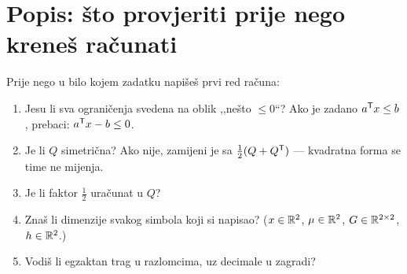 \section{Popis: što provjeriti prije nego kreneš računati}
\label{sec:kontrolna-lista}

\begin{predznanje}
Prije nego u bilo kojem zadatku napišeš prvi red računa:
\begin{enumerate}[nosep,leftmargin=*]
  \item Jesu li sva ograničenja svedena na oblik ,,nešto $\leq 0$``? Ako je
        zadano $a^{\mathsf{T}} x \leq b$, prebaci: $a^{\mathsf{T}} x - b \leq 0$.
  \item Je li $Q$ simetrična? Ako nije, zamijeni je sa $\tfrac{1}{2}(Q + Q^{\mathsf{T}})$ ---
        kvadratna forma se time ne mijenja.
  \item Je li faktor $\tfrac{1}{2}$ uračunat u $Q$?
  \item Znaš li dimenzije svakog simbola koji si napisao? ($x \in \mathbb{R}^2$,
        $\mu \in \mathbb{R}^2$, $G \in \mathbb{R}^{2\times2}$, $h \in \mathbb{R}^2$.)
  \item Vodiš li egzaktan trag u razlomcima, uz decimale u zagradi?
\end{enumerate}
\end{predznanje}
